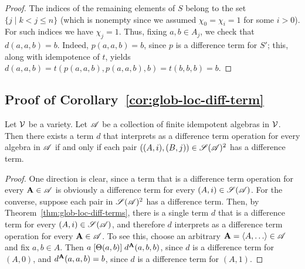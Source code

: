 \begin{proof}
The indices of the remaining elements of $S$
belong to the set $\{j \mid k<j\leq n\}$ (which is nonempty since we
assumed $\chi_0 = \chi_i = 1$ for some $i>0$).
For such indices we have $\chi_j = 1$.
Thus, fixing $a, b \in A_j$, we check that $d(a,a,b) = b$.
Indeed, $p(a,a,b) = b$, since $p$ is a \glocal difference term for $S'$;
this, along with idempotence of $t$, yields
$d(a,a,b) =t(p(a,a,b), p(a,a,b), b)=t(b, b, b) =b$.
\end{proof}

\subsection{Proof of Corollary~\ref{cor:glob-loc-diff-term}}
\label{sec:proof-cor:glob}
\begin{corollary} %
  Let $\mathcal{V}$ be a variety.  Let $\mathscr{A}$ be a collection of finite idempotent
  algebras in $\mathcal{V}$. %
  Then there exists a term $d$ that interprets as a difference term operation
  for every algebra in $\mathscr{A}$
  if and only if each pair $((A,i), (B,j)) \in \mathscr{S}(\mathscr{A})^2$ has a \glocal
  difference term.
\end{corollary}
\begin{proof}
  One direction is clear, since a term that is a difference term operation for
  every $\mathbf{A} \in \mathscr{A}$ is obviously a \glocal difference term for
  every $(A, i) \in \mathscr{S}(\mathscr{A})$.
  For the converse, suppose
  each pair in $\mathscr{S}(\mathscr{A})^2$ has a \glocal
  difference term. Then, by Theorem~\ref{thm:glob-loc-diff-terms},
  there is a single term $d$ that is a \glocal difference term for every
  $(A, i) \in \mathscr{S}(\mathscr{A})$,
  and therefore $d$ interprets as a difference term operation for every $\mathbf{A} \in \mathscr{A}$.
  To see this, choose an arbitrary $\bA = \<A, \dots\> \in \scA$ and fix $a, b \in A$.
  Then $a \mathrel{[\Theta(a,b)]} d^{\mathbf{A}}(a,b,b)$,
  since $d$ is a \glocal difference term for $(A,0)$,
  and $d^{\mathbf{A}}(a,a,b) = b$, since $d$ is a \glocal
  difference term for $(A,1)$.
\end{proof}



%
%
%
%






